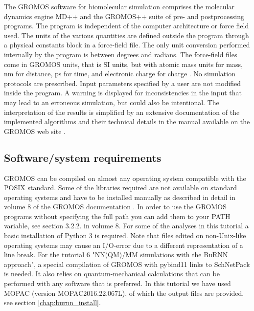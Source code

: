 The GROMOS software for biomolecular simulation comprises the molecular dynamics engine MD++ and the \linebreak GROMOS++ suite of pre- and postprocessing programs. The program is independent of the computer architecture or force field used. 
The units of the various quantities are defined outside the program through a physical constants block in a force-field file. The only unit conversion performed internally by the program is between degrees and radians. The force-field files come 
in GROMOS units, that is SI units, but with atomic mass units for mass, nm for distance, ps for time, and electronic charge for charge \cite{volume_6}. No simulation protocols are prescribed. 
Input parameters specified by a user are not modified inside 
the program. %
A warning is displayed for inconsistencies in the input that may lead to an erroneous simulation, but could also be intentional.
The interpretation of the results is simplified by an extensive 
documentation of the implemented algorithms and their technical details 
in the manual available on the GROMOS web site \cite{volume_6,volume_2}.

\subsection{Software/system requirements}
%
GROMOS can be compiled on almost any operating system compatible with the POSIX standard.
 Some of the libraries required are not available on standard operating systems and have to be installed 
manually as described in detail in volume 8 of the GROMOS documentation \cite{volume_8}. 
In order to use the GROMOS programs without specifying the full path you can add them to your PATH variable, see section 3.2.2. in volume 8.
For some of the analyses in this tutorial a basic installation of Python 3 is required. 
Note that files edited on non-Unix-like operating systems may cause an I/O-error due to a different representation of a line break. For the tutorial 6 "NN(QM)/MM simulations with the BuRNN approach", a special compilation of GROMOS with pybind11 links to SchNetPack is needed. It also relies on quantum-mechanical calculations that can be performed with any software that is preferred. In this tutorial we have used MOPAC (version MOPAC2016.22.067L), of which the output files are provided, see section \ref{chap:burnn_install}. 

